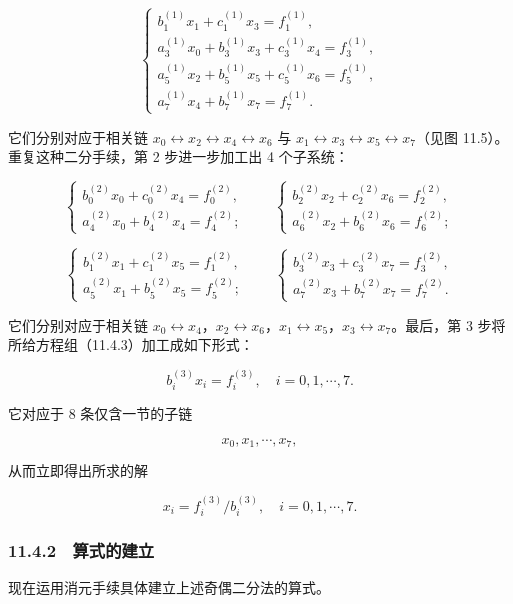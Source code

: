 \documentclass[
  10pt,
  fontset=fandol]{ctexart}
\begin{document}
\[
\begin{cases}
b_1^{(1)}x_1+c_1^{(1)}x_3=f_1^{(1)},\\
a_3^{(1)}x_0+b_3^{(1)}x_3+c_3^{(1)}x_4=f_3^{(1)},\\
a_5^{(1)}x_2+b_5^{(1)}x_5+c_5^{(1)}x_6=f_5^{(1)},\\
a_7^{(1)}x_4+b_7^{(1)}x_7=f_7^{(1)}.
\end{cases}
\]

它们分别对应于相关链 \(x_0\leftrightarrow x_2\leftrightarrow x_4\leftrightarrow x_6\) 与 \(x_1\leftrightarrow x_3\leftrightarrow x_5\leftrightarrow x_7\)（见图 11.5）。重复这种二分手续，第 2 步进一步加工出 4 个子系统：

\[
\begin{cases}
b_0^{(2)}x_0+c_0^{(2)}x_4=f_0^{(2)},\\
a_4^{(2)}x_0+b_4^{(2)}x_4=f_4^{(2)};
\end{cases}
\qquad
\begin{cases}
b_2^{(2)}x_2+c_2^{(2)}x_6=f_2^{(2)},\\
a_6^{(2)}x_2+b_6^{(2)}x_6=f_6^{(2)};
\end{cases}
\]

\[
\begin{cases}
b_1^{(2)}x_1+c_1^{(2)}x_5=f_1^{(2)},\\
a_5^{(2)}x_1+b_5^{(2)}x_5=f_5^{(2)};
\end{cases}
\qquad
\begin{cases}
b_3^{(2)}x_3+c_3^{(2)}x_7=f_3^{(2)},\\
a_7^{(2)}x_3+b_7^{(2)}x_7=f_7^{(2)}.
\end{cases}
\]

它们分别对应于相关链 \(x_0\leftrightarrow x_4\)，\(x_2\leftrightarrow x_6\)，\(x_1\leftrightarrow x_5\)，\(x_3\leftrightarrow x_7\)。最后，第 3 步将所给方程组（11.4.3）加工成如下形式：

\[
b_i^{(3)}x_i=f_i^{(3)},\quad i=0,1,\cdots,7.
\]

它对应于 8 条仅含一节的子链

\[
x_0,x_1,\cdots,x_7,
\]

从而立即得出所求的解

\[
x_i=f_i^{(3)}/b_i^{(3)},\quad i=0,1,\cdots,7.
\]

\subsubsection{11.4.2　算式的建立}\label{ux7b97ux5f0fux7684ux5efaux7acb}

现在运用消元手续具体建立上述奇偶二分法的算式。
\end{document}
